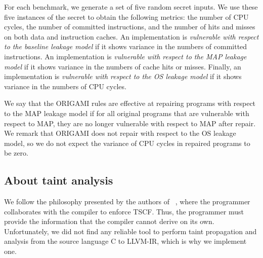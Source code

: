 
For each benchmark, we generate a set of five random secret inputs. %
We use these five instances of the secret to obtain the following metrics: the number of CPU cycles, the number of committed instructions, and the number of hits and misses on both data and instruction caches. An implementation is \emph{vulnerable with respect to the baseline leakage model} if it shows variance in the numbers of committed instructions. An implementation is \emph{vulnerable with respect to the MAP leakage model} if it shows variance in the numbers of cache hits or misses.  Finally, an implementation is \emph{vulnerable with respect to the OS leakage model} if it shows variance in the numbers of CPU cycles. 

We say that the ORIGAMI rules are effective at repairing programs with respect to the MAP leakage model if for all original programs that are vulnerable with respect to MAP, they are no longer vulnerable with respect to MAP after repair. We remark that ORIGAMI does not repair with respect to the OS leakage model, so we do not expect the variance of CPU cycles in repaired programs to be zero.

\subsection{About taint analysis} 
\label{sec:taint}
We follow the philosophy presented by the authors of ~\cite{WhatYouCisWhatYouGet}, where the programmer collaborates with the compiler to enforce TSCF. Thus, the programmer must provide the information that the compiler cannot derive on its own. Unfortunately, we did not find any reliable tool to perform taint propagation and analysis from the source language C to LLVM-IR, which is why we implement one. %

